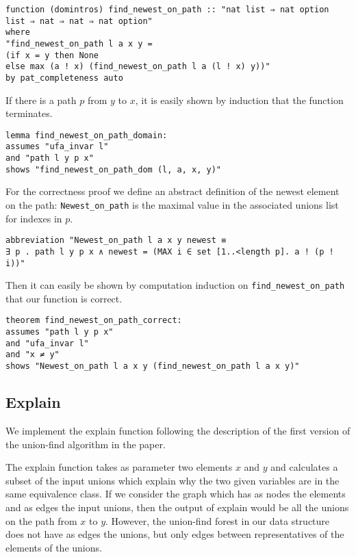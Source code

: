 \begin{lstlisting}
function (domintros) find_newest_on_path :: "nat list ⇒ nat option list ⇒ nat ⇒ nat ⇒ nat option"
where
"find_newest_on_path l a x y =
(if x = y then None
else max (a ! x) (find_newest_on_path l a (l ! x) y))"
by pat_completeness auto
\end{lstlisting}

If there is a path $p$ from $y$ to $x$, it is easily shown by induction that the function terminates.

\begin{lstlisting}
lemma find_newest_on_path_domain:
assumes "ufa_invar l"
and "path l y p x"
shows "find_newest_on_path_dom (l, a, x, y)"
\end{lstlisting}

For the correctness proof we define an abstract definition of the newest element on the path: \lstinline{Newest_on_path} is the maximal value in the associated unions list for indexes in $p$.

\begin{lstlisting}
abbreviation "Newest_on_path l a x y newest ≡
∃ p . path l y p x ∧ newest = (MAX i ∈ set [1..<length p]. a ! (p ! i))"
\end{lstlisting}

Then it can easily be shown by computation induction on \lstinline{find_newest_on_path} that our function is correct.

\begin{lstlisting}
theorem find_newest_on_path_correct:
assumes "path l y p x"
and "ufa_invar l"
and "x ≠ y"
shows "Newest_on_path l a x y (find_newest_on_path l a x y)"
\end{lstlisting}

\subsection{Explain}

We implement the explain function following the description of the first version of the union-find algorithm in the paper\cite{Nieuwenhuis}.

The explain function takes as parameter two elements $x$ and $y$ and calculates a subset of the input unions which explain why the two given variables are in the same equivalence class. If we consider the graph which has as nodes the elements and as edges the input unions, then the output of explain would be all the unions on the path from $x$ to $y$. However, the union-find forest in our data structure does not have as edges the unions, but only edges between representatives of the elements of the unions.

